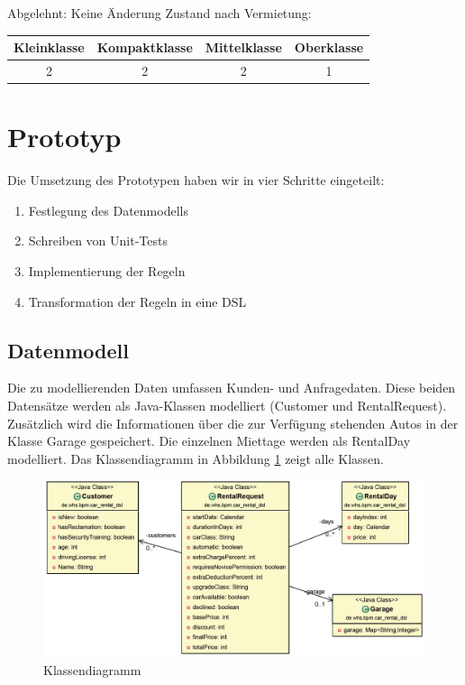 Abgelehnt: Keine Änderung
Zustand nach Vermietung:\\
\begin{tabular}{|c|c|c|c|}
	\hline \textbf{Kleinklasse} & \textbf{Kompaktklasse} & \textbf{Mittelklasse} & \textbf{Oberklasse}  \\ 
	\hline 2 & 2 & 2 & 1 \\ 
	\hline 
\end{tabular}

\section{Prototyp}

Die Umsetzung des Prototypen haben wir in vier Schritte eingeteilt:
\begin{enumerate}
	\item Festlegung des Datenmodells
	\item Schreiben von Unit-Tests
	\item Implementierung der Regeln
	\item Transformation der Regeln in eine DSL 
\end{enumerate}

\subsection{Datenmodell}

Die zu modellierenden Daten umfassen Kunden- und Anfragedaten. Diese beiden Datensätze
werden als Java-Klassen modelliert (Customer und RentalRequest). Zusätzlich wird die
Informationen über die zur Verfügung stehenden Autos in der Klasse Garage gespeichert.
Die einzelnen Miettage werden als RentalDay modelliert. Das Klassendiagramm in
Abbildung \ref{fig:Class_All} zeigt alle Klassen.

\begin{figure}[tbh]
\centering
\includegraphics[width=1.0\linewidth]{Bilder/Class_All}
\caption{Klassendiagramm}
\label{fig:Class_All}
\end{figure}

